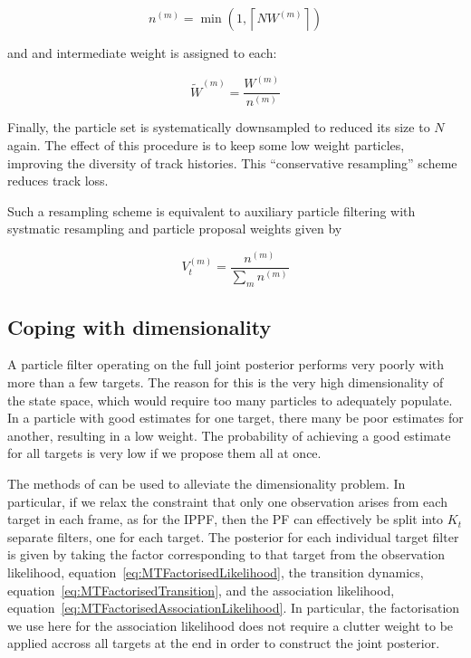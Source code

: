 \begin{equation}
n^{(m)} = \min(1,\left\lceil N W^{(m)} \right\rceil)
\label{eq:}
\end{equation}

and and intermediate weight is assigned to each:

\begin{equation}
\tilde{W}^{(m)} = \frac{W^{(m)}}{n^{(m)}}
\label{eq:}
\end{equation}

Finally, the particle set is systematically downsampled to reduced its size to $N$ again. The effect of this procedure is to keep some low weight particles, improving the diversity of track histories. This ``conservative resampling'' scheme reduces track loss.

Such a resampling scheme is equivalent to auxiliary particle filtering with systmatic resampling and particle proposal weights given by

\begin{equation}
V_t^{(m)} = \frac{n^{(m)}}{\sum_m n^{(m)}}
\label{eq:}
\end{equation}



\subsection{Coping with dimensionality}
A particle filter operating on the full joint posterior performs very poorly with more than a few targets. The reason for this is the very high dimensionality of the state space, which would require too many particles to adequately populate. In a particle with good estimates for one target, there many be poor estimates for another, resulting in a low weight. The probability of achieving a good estimate for all targets is very low if we propose them all at once.

The methods of \cite{Vermaak2005} can be used to alleviate the dimensionality problem. In particular, if we relax the constraint that only one observation arises from each target in each frame, as for the IPPF, then the PF can effectively be split into $K_t$ separate filters, one for each target. The posterior for each individual target filter is given by taking the factor corresponding to that target from the observation likelihood, equation~\ref{eq:MTFactorisedLikelihood}, the transition dynamics, equation~\ref{eq:MTFactorisedTransition}, and the association likelihood, equation~\ref{eq:MTFactorisedAssociationLikelihood}. In particular, the factorisation we use here for the association likelihood does not require a clutter weight to be applied accross all targets at the end in order to construct the joint posterior.

